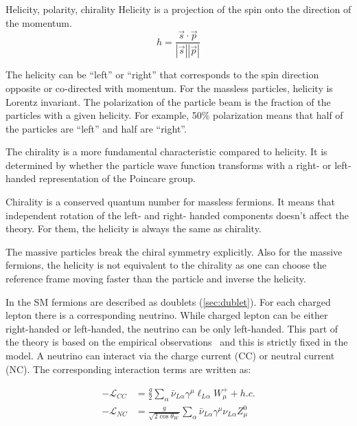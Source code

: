 \documentclass[../main.tex]{subfiles}
\begin{document}
\begin{bclogo}[couleur=blue!2, arrondi=0.1, logo=\bcinfo, nobreak=true]{Helicity, polarity, chirality}
Helicity is a projection of the spin onto the direction of the momentum.
\begin{equation}
h=\frac{\vec{s}\cdot\vec{p}}{\left|\vec{s}\right|\left|\vec{p}\right|}
\end{equation}

The helicity can be ``left'' or ``right'' that corresponds to the spin direction opposite or co-directed with momentum. For the massless particles, helicity is Lorentz invariant. The polarization of the particle beam is the fraction of the particles with a given helicity. For example, 50\% polarization means that half of the particles are ``left'' and half are ``right''.

The chirality is a more fundamental characteristic compared to helicity. It is determined by whether the particle wave function transforms with a right- or left-handed representation of the Poincare group.

Chirality is a conserved quantum number for massless fermions. It means that independent rotation of the left- and right- handed components doesn't affect the theory. For them, the helicity is always the same as chirality.

The massive particles break the chiral symmetry explicitly. Also for the massive fermions, the helicity is not equivalent to the chirality as one can choose the reference frame moving faster than the particle and inverse the helicity.
\end{bclogo}

In the SM fermions are described as doublets (\autoref{sec:dublet}). For each charged lepton there is a corresponding neutrino. While charged lepton can be either right-handed or left-handed, the neutrino can be only left-handed. This part of the theory is based on the empirical observations~\cite{Goldhaber1958} and this is strictly fixed in the model. A neutrino can interact via the charge current (CC) or neutral current (NC). The corresponding interaction terms are written as:

\begin{align}
-\mathcal{L}_{CC}&=\frac{g}{2}\sum_\alpha\bar{\nu}_{L\alpha}\gamma^\mu\ell_{L\alpha}W^+_\mu+h.c. \\ \nonumber
-\mathcal{L}_{NC}&=\frac{g}{\sqrt{2\cos{\theta_W}}}\sum_\alpha\bar{\nu}_{L\alpha}\gamma^\mu\nu_{L\alpha}Z^0_\mu
\end{align}
\end{document}
